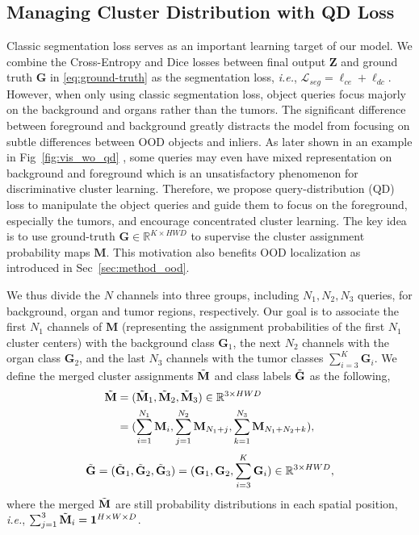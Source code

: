 \documentclass[10pt,twocolumn,letterpaper]{article}
\begin{document}
\subsection{Managing Cluster Distribution with QD Loss}
\label{sec:qd_loss}
Classic segmentation loss serves as an important learning target of our model. We combine the Cross-Entropy and Dice losses between final output $\mathbf{Z}$ and ground truth $\mathbf{G}$ in \cref{eq:ground-truth} as the  segmentation loss, \textit{i.e.}, $\mathcal{L}_{seg} = \ell_{ce} + \ell_{dc}.$ However, when only using classic segmentation loss, object queries focus majorly on the background and organs rather than the tumors. The significant difference between foreground and background greatly distracts the model from focusing on subtle differences between OOD objects and inliers. As later shown in an example in Fig~\ref{fig:vis_wo_qd} , some queries may even have mixed representation on background and foreground which is an unsatisfactory phenomenon for discriminative cluster learning. 
Therefore, we propose query-distribution (QD) loss to manipulate the object queries and guide them to focus on the foreground, especially the tumors, and encourage concentrated cluster learning. The key idea is to use ground-truth $\mathbf{G} \in \mathbb{R}^{K \times HWD}$ to supervise the cluster assignment probability maps $\mathbf{M}$. This motivation also benefits OOD localization as introduced in Sec~\ref{sec:method_ood}.

We thus divide the $N$ channels into three groups, including $N_{1}, N_{2}, N_{3}$ queries, for background, organ and tumor regions, respectively.  
Our goal is to associate the first $N_1$ channels of $\mathbf{M}$ (representing the assignment probabilities of the first $N_1$ cluster centers) with the background class $\mathbf{G}_1$, the next $N_2$ channels with the organ class $\mathbf{G}_2$, and the last $N_3$ channels with the tumor classes $\sum_{i=3}^{K}\mathbf{G}_i$. We define the merged cluster assignments $\Tilde{\mathbf{M}}$ and class labels $\Tilde{\mathbf{G}}$ as the following,
\begin{equation}
\begin{split}
    \Tilde{\mathbf{M}} &= (\Tilde{\mathbf{M}}_1,\Tilde{\mathbf{M}}_2,\Tilde{\mathbf{M}}_3)  \in \mathbb{R}^{3 \times HWD}\\
   &=(\sum_{i=1}^{N_1}\mathbf{M}_i, \sum_{j=1}^{N_{2}}\mathbf{M}_{N_{1}+j},
   \sum_{k=1}^{N_{3}}\mathbf{M}_{N_{1}+N_{2}+k}),
\end{split}
\end{equation}
\begin{equation}
    \Tilde{\mathbf{G}} = (\Tilde{\mathbf{G}}_1,\Tilde{\mathbf{G}}_2,\Tilde{\mathbf{G}}_3) = (\mathbf{G}_1, \mathbf{G}_2,
   \sum_{i=3}^{K}\mathbf{G}_i)  \in \mathbb{R}^{3 \times HWD},
\end{equation}
where the merged $\Tilde{\mathbf{M}}$ are still probability distributions in each spatial position, \textit{i.e.}, $\sum_{j=1}^{3} \Tilde{\mathbf{M}}_{i} = \mathbf{1}^{H\times W \times D}$. 
\end{document}
